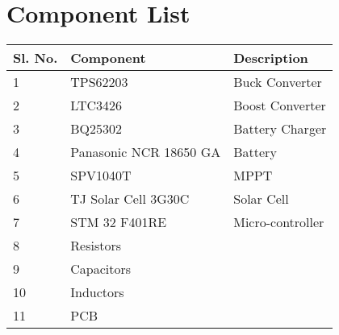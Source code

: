 \chapter{Component List}
\begin{table}[h]
	\begin{center}
	\begin{tabular}{|l|l|l|}
		\hline
		{\bf Sl. No.} & {\bf Component} & {\bf Description} \\ \hline
1 & TPS62203 & Buck Converter \\ \hline
2 & LTC3426 & Boost Converter \\ \hline
3 & BQ25302 & Battery Charger \\ \hline
4 & Panasonic NCR 18650 GA & Battery \\ \hline
5 & SPV1040T & MPPT \\ \hline
6 & TJ Solar Cell 3G30C & Solar Cell \\ \hline
7 & STM 32 F401RE & Micro-controller \\ \hline
8 & Resistors &  \\ \hline
9 & Capacitors &  \\ \hline
10 & Inductors &  \\ \hline
11 & PCB &  \\ \hline
	\end{tabular}
	\end{center}
\end{table}